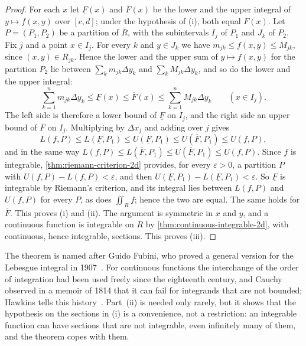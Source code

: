 \begin{proof}
For each $x$ let $\underline F(x)$ and $\overline F(x)$ be the lower and the upper integral of $y\mapsto f(x,y)$ over $[c,d]$; under the hypothesis of (i), both equal $F(x)$. Let $P=(P_1,P_2)$ be a partition of $R$, with the subintervals $I_j$ of $P_1$ and $J_k$ of $P_2$. Fix $j$ and a point $x\in I_j$. For every $k$ and $y\in J_k$ we have $m_{jk}\le f(x,y)\le M_{jk}$, since $(x,y)\in R_{jk}$. Hence the lower and the upper sum of $y\mapsto f(x,y)$ for the partition $P_2$ lie between $\sum_km_{jk}\Delta y_k$ and $\sum_kM_{jk}\Delta y_k$, and so do the lower and the upper integral:
\[
\sum_{k=1}^nm_{jk}\Delta y_k\le\underline F(x)\le\overline F(x)\le\sum_{k=1}^nM_{jk}\Delta y_k\qquad(x\in I_j).
\]
The left side is therefore a lower bound of $\underline F$ on $I_j$, and the right side an upper bound of $\overline F$ on $I_j$. Multiplying by $\Delta x_j$ and adding over $j$ gives
\[
L(f,P)\le L(\underline F,P_1)\le U(\underline F,P_1)\le U(\overline F,P_1)\le U(f,P),
\]
and in the same way $L(f,P)\le L(\overline F,P_1)\le U(\overline F,P_1)\le U(f,P)$. Since $f$ is integrable, \cref{thm:riemann-criterion-2d} provides, for every $\varepsilon>0$, a partition $P$ with $U(f,P)-L(f,P)<\varepsilon$, and then $U(\underline F,P_1)-L(\underline F,P_1)<\varepsilon$. So $\underline F$ is integrable by Riemann's criterion, and its integral lies between $L(f,P)$ and $U(f,P)$ for every $P$, as does $\iint_Rf$; hence the two are equal. The same holds for $\overline F$. This proves (i) and (ii). The argument is symmetric in $x$ and $y$, and a continuous function is integrable on $R$ by \cref{thm:continuous-integrable-2d}, with continuous, hence integrable, sections. This proves (iii).
\end{proof}

The theorem is named after Guido Fubini, who proved a general version for the Lebesgue integral in 1907~\cite{fubini1907}. For continuous functions the interchange of the order of integration had been used freely since the eighteenth century, and Cauchy observed in a memoir of 1814 that it can fail for integrands that are not bounded; Hawkins tells this history~\cite{hawkins1975}. Part~(ii) is needed only rarely, but it shows that the hypothesis on the sections in (i) is a convenience, not a restriction: an integrable function can have sections that are not integrable, even infinitely many of them, and the theorem copes with them.

